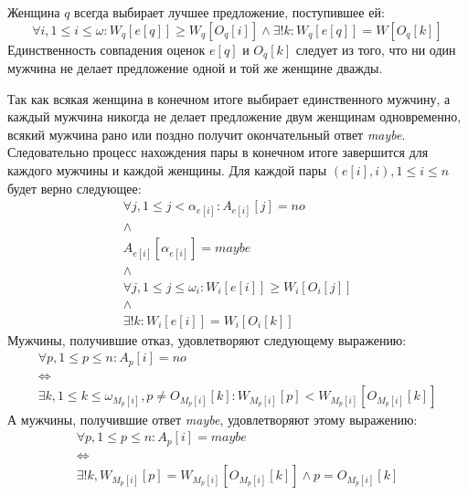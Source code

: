 \documentclass{article}
\begin{document}
Женщина \( q \) всегда выбирает лучшее предложение, поступившее ей:
\begin{displaymath}
\forall i, 1 \leq i \leq \omega : W_q[e[q]] \geq W_q[O_q[i]] \land \exists ! k : W_q[e[q]] = W[O_q[k]]
\end{displaymath}
Единственность совпадения оценок \( e[q] \) и \( O_q[k] \) следует из того, что ни один мужчина не делает предложение одной и той же женщине
дважды.

Так как всякая женщина в конечном итоге выбирает единственного мужчину, а каждый мужчина никогда не делает предложение двум женщинам одновременно,
всякий мужчина рано или поздно получит окончательный ответ \emph{maybe}. Следовательно процесс нахождения пары в конечном итоге завершится для каждого
мужчины и каждой женщины. Для каждой пары \( (e[i],i), 1 \leq i \leq n \) будет верно следующее:
\begin{equation}
    \label{pr:final1}
    \begin{array}{c}
    \forall j, 1 \leq j < \alpha_{e[i]} : A_{e[i]}[j] = no \\
    \land \\
    A_{e[i]}[\alpha_{e[i]}] = maybe \\
    \land \\
    \forall j, 1 \leq j \leq \omega_i : W_i[e[i]] \geq W_i[O_i[j]] \\
    \land \\
    \exists ! k : W_i[e[i]] = W_i[O_i[k]]
    \end{array}
\end{equation}
Мужчины, получившие отказ, удовлетворяют следующему выражению:
\begin{displaymath}
\begin{array}{c}
\forall p, 1 \leq p \leq n : A_p[i] = no \\
\Leftrightarrow \\
\exists k, 1 \leq k \leq \omega_{M_p[i]}, p \neq O_{M_p[i]}[k] : W_{M_p[i]}[p] < W_{M_p[i]}[O_{M_p[i]}[k]]
\end{array}
\end{displaymath}
А мужчины, получившие ответ \emph{maybe}, удовлетворяют этому выражению:
\begin{displaymath}
\begin{array}{c}
\forall p, 1 \leq p \leq n : A_p[i] = maybe \\
\Leftrightarrow \\
\exists ! k, W_{M_p[i]}[p] = W_{M_p[i]}[O_{M_p[i]}[k]] \land p = O_{M_p[i]}[k]
\end{array}
\end{displaymath}
\end{document}
